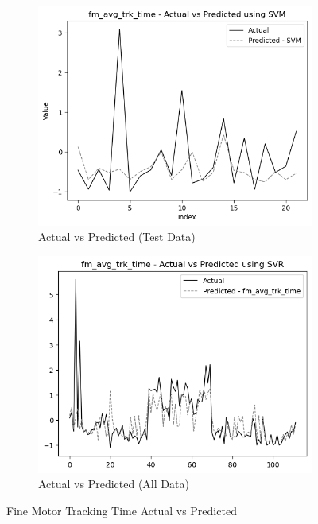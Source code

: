 \begin{figure}[htbp]
    \centering
    \begin{subfigure}[b]{0.49\textwidth}
        \centering
        \includegraphics[width=\textwidth]{images/regressionCharts/test_data_fine_motor_tracking_time.png}
        \caption{Actual vs Predicted (Test Data)}
        \label{fig:actual_vs_predicted_fm_avg_trk_time_test}
    \end{subfigure}\hfill
    \begin{subfigure}[b]{0.49\textwidth}
        \centering
        \includegraphics[width=\textwidth]{images/regressionCharts/all_data_fine_motor_tracking_time.png}
        \caption{Actual vs Predicted (All Data)}
        \label{fig:actual_vs_predicted_fm_avg_trk_time_all_data}
    \end{subfigure}
    \caption{Fine Motor Tracking Time Actual vs Predicted}
    \label{fig:fine_motor_tracking_time_comparison}
\end{figure}

